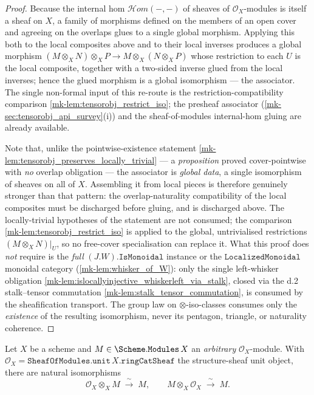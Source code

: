 \begin{lemma}
\begin{proof}
  Because the internal hom \(\mathcal{H}om(-,-)\) of sheaves of
  \(\mathcal{O}_X\)-modules is itself a sheaf on \(X\), a family of morphisms defined
  on the members of an open cover and agreeing on the overlaps glues to a single
  global morphism. Applying this both to the local composites above and to their
  local inverses produces a global morphism
  \((M \otimes_X N) \otimes_X P \to M \otimes_X (N \otimes_X P)\) whose restriction
  to each \(U\) is the local composite, together with a two-sided inverse glued from
  the local inverses; hence the glued morphism is a global isomorphism --- the
  associator. The single non-formal input of this re-route is the
  restriction-compatibility comparison \ref{mk-lem:tensorobj_restrict_iso}; the presheaf
  associator (\ref{mk-sec:tensorobj_api_survey}(i)) and the sheaf-of-modules
  internal-hom gluing are already available.

  Note that, unlike the pointwise-existence statement
  \ref{mk-lem:tensorobj_preserves_locally_trivial} --- a \emph{proposition} proved
  cover-pointwise with \emph{no} overlap obligation --- the associator is
  \emph{global data}, a single isomorphism of sheaves on all of \(X\). Assembling it
  from local pieces is therefore genuinely stronger than that pattern: the
  overlap-naturality compatibility of the local composites must be discharged before
  gluing, and is discharged above. The locally-trivial hypotheses of the statement
  are not consumed; the comparison \ref{mk-lem:tensorobj_restrict_iso} is applied to the
  global, untrivialised restrictions \((M \otimes_X N)|_U\), so no free-cover
  specialisation can replace it. What this proof does \emph{not} require is the
  \emph{full} \((J.W).\mathtt{IsMonoidal}\) instance or the
  \(\mathtt{LocalizedMonoidal}\) monoidal category
  (\ref{mk-lem:whisker_of_W}): only the single left-whisker obligation
  \ref{mk-lem:islocallyinjective_whiskerleft_via_stalk}, closed via the d.2 stalk--tensor
  commutation \ref{mk-lem:stalk_tensor_commutation}, is consumed by the sheafification
  transport. The group law on \(\otimes\)-iso-classes
  consumes only the \emph{existence} of the resulting isomorphism, never its pentagon,
  triangle, or naturality coherence.
\end{proof}

\end{lemma}

\begin{lemma}
  \label{mk-lem:tensorobj_unit_iso}
  \leanok

  Let \(X\) be a scheme and \(M \in \Scheme.\mathtt{Modules}\,X\) an
  \emph{arbitrary} \(\mathcal{O}_X\)-module. With
  \(\mathcal{O}_X = \mathtt{SheafOfModules.unit}\,X.\mathtt{ringCatSheaf}\) the
  structure-sheaf unit object, there are natural isomorphisms
  \[
    \mathcal{O}_X \otimes_X M \;\xrightarrow{\ \sim\ }\; M,
    \qquad
    M \otimes_X \mathcal{O}_X \;\xrightarrow{\ \sim\ }\; M .
  \]
\end{lemma}

